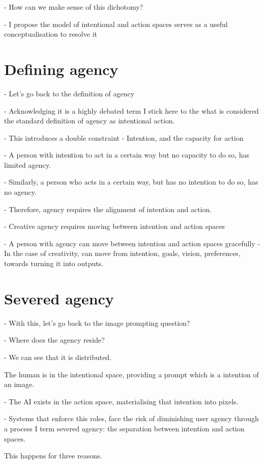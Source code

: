 - How can we make sense of this dichotomy? 

- I propose the model of intentional and action spaces serves as a useful conceptualisation to resolve it

\section{Defining agency}

- Let's go back to the definition of agency

- Acknowledging it is a highly debated term
I stick here to the what is considered the standard definition of agency as intentional action. \cite{Schlosser2019-jk}

- This introduces a double constraint
- Intention, and the capacity for action 

- A person with intention to act in a certain way but no capacity to do so, has limited agency. 

- Similarly, a person who acts in a certain way, but has no intention to do so, has no agency. 

- Therefore, agency requires the alignment of intention and action. 

- Creative agency requires moving between intention and action spaces 

- A person with agency can move between intention and action spaces gracefully
- In the case of creativity, can move from intention, goals, vision, preferences, towards turning it into outputs.

\section{Severed agency}

- With this, let’s go back to the image prompting question? 

- Where does the agency reside? 

- We can see that it is distributed. 

The human is in the intentional space, providing a prompt which is a intention of an image. 

- The AI exists in the action space, materialising that intention into pixels. 

- Systems that enforce this roles, face the risk of diminishing user agency through a process I term severed agency: the separation between intention and action spaces. 

This happens for three reasons. 


